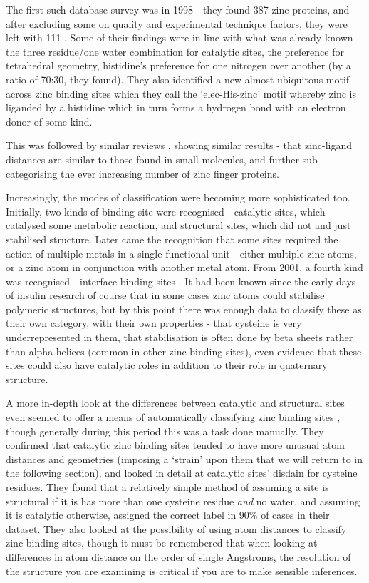 The first such database survey was in 1998 - they found 387 zinc proteins, and after excluding some on quality and experimental technique factors, they were left with 111 \cite{alberts1998analysis}. Some of their findings were in line with what was already known - the three residue/one water combination for catalytic sites, the preference for tetrahedral geometry, histidine's preference for one nitrogen over another (by a ratio of 70:30, they found). They also identified a new almost ubiquitous motif across zinc binding sites which they call the `elec-His-zinc' motif whereby zinc is liganded by a histidine which in turn forms a hydrogen bond with an electron donor of some kind.

This was followed by similar reviews \cite{roe1999zinc,laity2001zinc,grishin2001treble,harding2001geometry,krishna2003structural}, showing similar results - that zinc-ligand distances are similar to those found in small molecules, and further sub-categorising the ever increasing number of zinc finger proteins.

Increasingly, the modes of classification were becoming more sophisticated too. Initially, two kinds of binding site were recognised - catalytic sites, which catalysed some metabolic reaction, and structural sites, which did not and just stabilised structure. Later came the recognition that some sites required the action of multiple metals in a single functional unit - either multiple zinc atoms, or a zinc atom in conjunction with another metal atom. From 2001, a fourth kind was recognised - interface binding sites \cite{auld2001zinc}. It had been known since the early days of insulin research of course that in some cases zinc atoms could stabilise polymeric structures, but by this point there was enough data to classify these as their own category, with their own properties - that cysteine is very underrepresented in them, that stabilisation is often done by beta sheets rather than alpha helices (common in other zinc binding sites), even evidence that these sites could also have catalytic roles in addition to their role in quaternary structure.

A more in-depth look at the differences between catalytic and structural sites even seemed to offer a means of automatically classifying zinc binding sites \cite{lee2008physical}, though generally during this period this was a task done manually. They confirmed that catalytic zinc binding sites tended to have more unusual atom distances and geometries (imposing a `strain' upon them that we will return to in the following section), and looked in detail at catalytic sites' disdain for cysteine residues. They found that a relatively simple method of assuming a site is structural if it is has more than one cysteine residue \textit{and} no water, and assuming it is catalytic otherwise, assigned the correct label in 90\% of cases in their dataset. They also looked at the possibility of using atom distances to classify zinc binding sites, though it must be remembered that when looking at differences in atom distance on the order of single Angstroms, the resolution of the structure you are examining is critical if you are to make sensible inferences.

